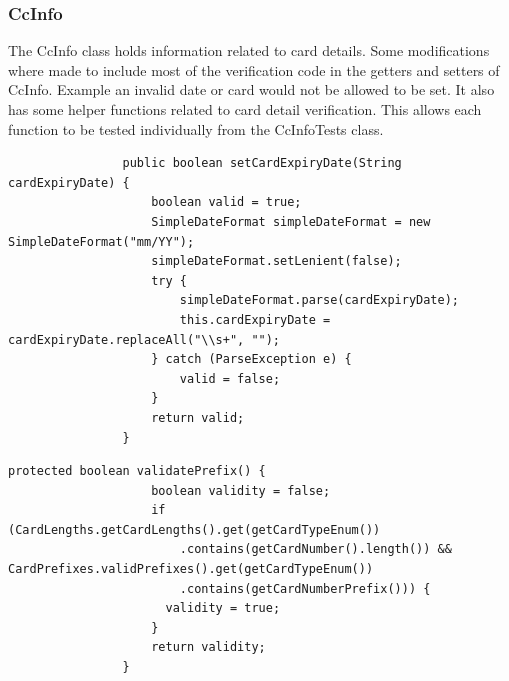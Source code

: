 \documentclass[11pt, a4paper]{article}
\begin{document}
        \subsubsection{CcInfo}
            The CcInfo class holds information related to card details. Some modifications where made to include most of the verification code in the getters and setters of CcInfo. Example an invalid date or card would not be allowed to be set. It also has some helper functions related to card detail verification. This allows each function to be tested individually from the CcInfoTests class.
            \begin{lstlisting}
                public boolean setCardExpiryDate(String cardExpiryDate) {
                    boolean valid = true;
                    SimpleDateFormat simpleDateFormat = new SimpleDateFormat("mm/YY");
                    simpleDateFormat.setLenient(false);
                    try {
                        simpleDateFormat.parse(cardExpiryDate);
                        this.cardExpiryDate = cardExpiryDate.replaceAll("\\s+", "");
                    } catch (ParseException e) {
                        valid = false;
                    }
                    return valid;
                }
            \end{lstlisting}
            \begin{lstlisting}[caption=A helper function that checks the card prefixes]
                protected boolean validatePrefix() {
                    boolean validity = false;
                    if (CardLengths.getCardLengths().get(getCardTypeEnum())
                        .contains(getCardNumber().length()) && CardPrefixes.validPrefixes().get(getCardTypeEnum())
                        .contains(getCardNumberPrefix())) {
                      validity = true;
                    }
                    return validity;
                }
            \end{lstlisting}
\end{document}

